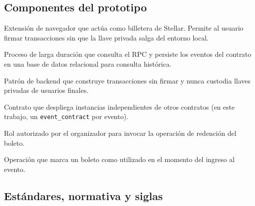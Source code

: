 \subsection*{Componentes del prototipo}

\begin{description}\setlength{\itemsep}{2pt}
\item[Freighter] Extensión de navegador que actúa como billetera de Stellar. Permite al usuario firmar transacciones sin que la llave privada salga del entorno local.
\item[Indexer (indexador)] Proceso de larga duración que consulta el RPC y persiste los eventos del contrato en una base de datos relacional para consulta histórica.
\item[\textit{XDR proxy} \textit{stateless}] Patrón de backend que construye transacciones sin firmar y nunca custodia llaves privadas de usuarios finales.
\item[\textit{Factory contract}] Contrato que despliega instancias independientes de otros contratos (en este trabajo, un \texttt{event\_contract} por evento).
\item[\textit{Verificador en puerta}] Rol autorizado por el organizador para invocar la operación de redención del boleto.
\item[Redención] Operación que marca un boleto como utilizado en el momento del ingreso al evento.
\end{description}

\subsection*{Estándares, normativa y siglas}

